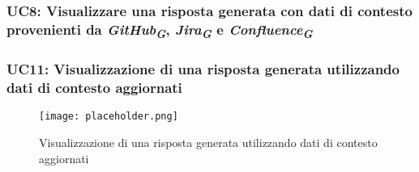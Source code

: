 \hypertarget{UC8}{}
\subsubsection{UC8: Visualizzare una risposta generata con dati di contesto provenienti da 
\emph{GitHub}\textsubscript{\textbf{\textit{G}}}, \emph{Jira}\textsubscript{\textbf{\textit{G}}} e 
\emph{Confluence}\textsubscript{\textbf{\textit{G}}}}






\hypertarget{UC11}{}
\subsubsection{UC11: Visualizzazione di una risposta generata utilizzando dati di contesto aggiornati}

\begin{figure}[h]
    \centering
    \texttt{[image: placeholder.png]}
    \caption{Visualizzazione di una risposta generata utilizzando dati di contesto aggiornati}
\end{figure}


